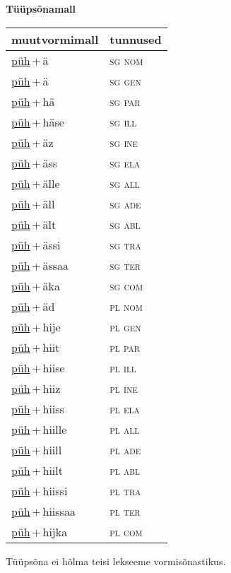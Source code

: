
\vspace{1.8em}
\begin{minipage}{\textwidth}
\textbf{Tüüpsõnamall \,}\\

\begin{sideways}
\begin{tabular}{l l}
muutvormimall & tunnused \\
\hline
\underline{püh}\,+\,ä & \textsc{ sg nom } \\
\underline{püh}\,+\,ä & \textsc{ sg gen } \\
\underline{püh}\,+\,hä & \textsc{ sg par } \\
\underline{püh}\,+\,häse & \textsc{ sg ill } \\
\underline{püh}\,+\,äz & \textsc{ sg ine } \\
\underline{püh}\,+\,äss & \textsc{ sg ela } \\
\underline{püh}\,+\,älle & \textsc{ sg all } \\
\underline{püh}\,+\,äll & \textsc{ sg ade } \\
\underline{püh}\,+\,ält & \textsc{ sg abl } \\
\underline{püh}\,+\,ässi & \textsc{ sg tra } \\
\underline{püh}\,+\,ässaa & \textsc{ sg ter } \\
\underline{püh}\,+\,äka & \textsc{ sg com } \\
\underline{püh}\,+\,äd & \textsc{ pl nom } \\
\underline{püh}\,+\,hije & \textsc{ pl gen } \\
\underline{püh}\,+\,hiit & \textsc{ pl par } \\
\underline{püh}\,+\,hiise & \textsc{ pl ill } \\
\underline{püh}\,+\,hiiz & \textsc{ pl ine } \\
\underline{püh}\,+\,hiiss & \textsc{ pl ela } \\
\underline{püh}\,+\,hiille & \textsc{ pl all } \\
\underline{püh}\,+\,hiill & \textsc{ pl ade } \\
\underline{püh}\,+\,hiilt & \textsc{ pl abl } \\
\underline{püh}\,+\,hiissi & \textsc{ pl tra } \\
\underline{püh}\,+\,hiissaa & \textsc{ pl ter } \\
\underline{püh}\,+\,hijka & \textsc{ pl com } \\
\end{tabular}
\end{sideways}
\label{tab:tüüpsõnamall-pühä}

\end{minipage}

 
\vspace{1em}
\noindent Tüüpsõna ei hõlma teisi lekseeme vormi\-sõnastikus.
